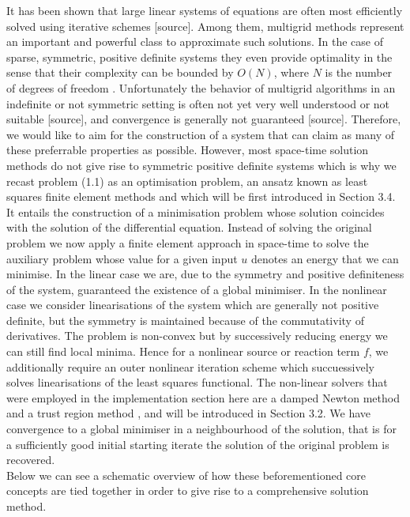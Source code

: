 \documentclass[../draft_1.tex]{subfiles}
\begin{document}
It has been shown that large linear systems of equations are often most efficiently solved using iterative schemes [source]. Among them, multigrid methods represent an important and powerful class to approximate such solutions. In the case of sparse, symmetric, positive definite systems they even provide optimality in the sense that their complexity can be bounded by $O(N)$, where $N$ is the number of degrees of freedom \cite{brandt1977multi}. Unfortunately the behavior of multigrid algorithms in an indefinite or not symmetric setting is often not yet very well understood or not suitable [source], and convergence is generally not guaranteed [source]. Therefore, we would like to aim for the construction of a system that can claim as many of these preferrable properties as possible. However, most space-time solution methods do not give rise to symmetric positive definite systems \cite{gander201550} which is why we recast problem (1.1) as an optimisation problem, an ansatz known as least squares finite element methods \cite{bochev2009least} and which will be first introduced in Section 3.4. It entails the construction of a minimisation problem whose solution coincides with the solution of the differential equation. Instead of solving the original problem we now apply a finite element approach in space-time to solve the auxiliary problem whose value for a given input $u$ denotes an energy that we can minimise. In the linear case we are, due to the symmetry and positive definiteness of the system, guaranteed the existence of a global minimiser. In the nonlinear case we consider linearisations of the system which are generally not positive definite, but the symmetry is maintained because of the commutativity of derivatives. The problem is non-convex but by successively reducing energy we can still find local minima. Hence for a nonlinear source or reaction term $f$, we additionally require an outer nonlinear iteration scheme which succuessively solves linearisations of the least squares functional. The non-linear solvers that were employed in the implementation section here are a damped Newton method \cite{deuflhard2011newton} and a trust region method \cite{conn2000trust}, and will be introduced in Section 3.2. We have convergence to a global minimiser in a neighbourhood of the solution, that is for a sufficiently good initial starting iterate the solution of the original problem is recovered.
\smallskip
\\
Below we can see a schematic overview of how these beforementioned core concepts are tied together in order to give rise to a comprehensive solution method.
\end{document}
